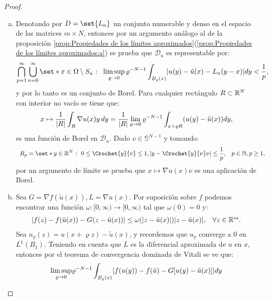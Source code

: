 \documentclass[a4paper,11pt,spanish, twoside, leqno]{tfm-uam}
\begin{document}
\begin{proof}
\begin{enumerate}[(a)]
\item Denotando por $D=\set{L_{n}}$ un conjunto numerable y denso en el espacio de las matrices $m\times N$, entonces por un argumento análogo al de la proposición \ref{prop:Propiedades de los límites aproximados}(\ref{prop:Propiedades de los límites aproximados:a}) se prueba que $\mathcal{D}_{u}$ es representable por:
\begin{align*}
\bigcap_{p=1}^{\infty}\bigcup_{n=0}^{\infty}\set*{x\in \Omega\setminus S_{u}\given \limsup_{\varrho\to 0} \varrho^{-N-1}\int_{B_{\varrho}(x)}\abs{u(y)-\tilde{u}(x)-L_{n}(y-x)}dy<\dfrac{1}{p}},
\end{align*}
y por lo tanto es un conjunto de Borel. Para cualquier rectángulo $R\subset \R^{N}$ con interior no vacío se tiene que:
\begin{align*}
x\mapsto \dfrac{1}{\abs{R}}\int_{R}\nabla{u}(x)y\,dy=\dfrac{1}{\abs{R}}\lim_{\varrho\to 0}\varrho^{-N-1}\int_{x+\varrho R}(u(y)-\tilde{u}(x))dy,
\end{align*}
es una función de Borel en $\mathcal{D}_{u}$. Dado $\nu\in \mathbb{S}^{N-1}$ y tomando:
\begin{align*}
\begin{array}{ll}
\displaystyle
R_{p}=\set*{y\in \R^{N}\given 0\leq \Crochet{y}{v}\leq 1, \abs{y-\Crochet{y}{\nu}\nu}\leq \dfrac{1}{p}}, & p\in \N, p\geq 1,
\end{array}
\end{align*}
por un argumento de límite se prueba que $x\mapsto \nabla{u}(x)\nu$ es una aplicación de Borel.
\item Sea $G=\nabla{f(\tilde{u}(x))}, L=\nabla{u}(x)$. Por suposición sobre $f$ podemos encontrar una función $\omega:[0,\infty)\to[0,\infty)$ tal que $\omega(0)=0$ y:
\begin{align*}
\begin{array}{ll}
\displaystyle
\abs*{f(z)-f(\tilde{u}(x))-G(z-\tilde{u}(x))}\leq \omega(\abs{z-\tilde{u}(x)})\abs{z-\tilde{u}(x)},& \forall z\in \R^{m}.
\end{array}
\end{align*}
Sea $u_{\varrho}(z)=u(x+\varrho z)-\tilde{u}(x)$, y recordemos que $u_{\varrho}$ converge a $0$ en $L^{1}(B_{1})$. Teniendo en cuenta que $L$ es la diferencial aproximada de $u$ en $x$, entonces por el teorema de convergencia dominada de Vitali se ve que:
\begin{align*}
\limsup_{\varrho\to 0}& \varrho^{-N-1}\int_{B_{\varrho}(x)}\abs{f(u(y))-f(\tilde{u})-G[u(y)-\tilde{u}(x)]} dy\\

\end{align*}
\end{enumerate}
\end{proof}
\end{document}
